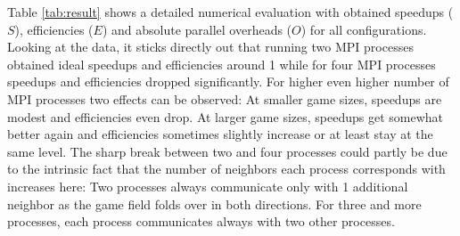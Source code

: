 \documentclass[a4paper,11pt,twoside,table,xcdraw]{article}
\begin{document}
Table \ref{tab:result} shows a detailed numerical evaluation with obtained speedups ($S$), efficiencies ($E$) and absolute parallel overheads ($O$) for all configurations. Looking at the data, it sticks directly out that running two MPI processes obtained ideal speedups and efficiencies around 1 while for four MPI processes speedups and efficiencies dropped significantly. For higher even higher number of MPI processes two effects can be observed: At smaller game sizes, speedups are modest and efficiencies even drop. At larger game sizes, speedups get somewhat better again and efficiencies sometimes slightly increase or at least stay at the same level. The sharp break between two and four processes could partly be due to the intrinsic fact that the number of neighbors each process corresponds with increases here: Two processes always communicate only with 1 additional neighbor as the game field folds over in both directions. For three and more processes, each process communicates always with two other processes.
\end{document}
